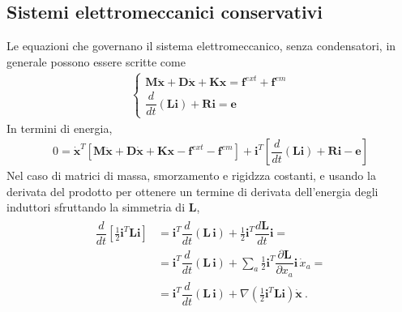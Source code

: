 \documentclass[letterpaper,10pt,italian]{jupyterBook}
\begin{document}
\subsection{Sistemi elettromeccanici conservativi}
\label{\detokenize{ch/circuits-electromechanic:sistemi-elettromeccanici-conservativi}}
\sphinxAtStartPar
Le equazioni che governano il sistema elettromeccanico, senza condensatori, in generale possono essere scritte come
\begin{equation*}
\begin{split}\begin{cases}
 \mathbf{M} \ddot{\mathbf{x}} + \mathbf{D} \dot{\mathbf{x}} + \mathbf{K} \mathbf{x} = \mathbf{f}^{ext} + \mathbf{f}^{em} \\
 \dfrac{d}{dt} \left( \mathbf{L} \mathbf{i} \right) + \mathbf{R} \mathbf{i} = \mathbf{e}
\end{cases}\end{split}
\end{equation*}
\sphinxAtStartPar
In termini di energia,
\begin{equation*}
\begin{split}
0 = \dot{\mathbf{x}}^T \left[ \mathbf{M} \ddot{\mathbf{x}} + \mathbf{D} \dot{\mathbf{x}} + \mathbf{K} \mathbf{x} - \mathbf{f}^{ext} - \mathbf{f}^{em} \right] + \mathbf{i}^T \left[ \dfrac{d}{dt} \left( \mathbf{L} \mathbf{i} \right) + \mathbf{R} \mathbf{i} - \mathbf{e} \right]
\end{split}
\end{equation*}
\sphinxAtStartPar
Nel caso di matrici di massa, smorzamento e rigidzza costanti, e usando la derivata del prodotto per ottenere un termine di derivata dell’energia degli induttori sfruttando la simmetria di \(\mathbf{L}\),
\begin{equation}\label{equation:ch/circuits-electromechanic:classical-electromagnetism:circuits-electromechanic:energy-mech-0}
\begin{split} \begin{aligned}
\dfrac{d}{dt} \left[ \frac{1}{2} \mathbf{i}^T \mathbf{L} \mathbf{i} \right] 
  & = \mathbf{i}^T \dfrac{d}{dt} \left( \mathbf{L} \, \mathbf{i} \right) + \frac{1}{2} \mathbf{i}^T \dfrac{d \mathbf{L}}{dt} \mathbf{i} = \\
  & = \mathbf{i}^T \dfrac{d}{dt} \left( \mathbf{L} \, \mathbf{i} \right) + \sum_{a} \frac{1}{2} \mathbf{i}^T \dfrac{\partial \mathbf{L}}{\partial x_a} \mathbf{i} \, \dot{x}_a = \\
  & = \mathbf{i}^T \dfrac{d}{dt} \left( \mathbf{L} \, \mathbf{i} \right) + \nabla \left( \frac{1}{2} \mathbf{i}^T \mathbf{L} \mathbf{i} \right) \dot{\mathbf{x}}  \ .
\end{aligned}\end{split}
\end{equation}
\end{document}
